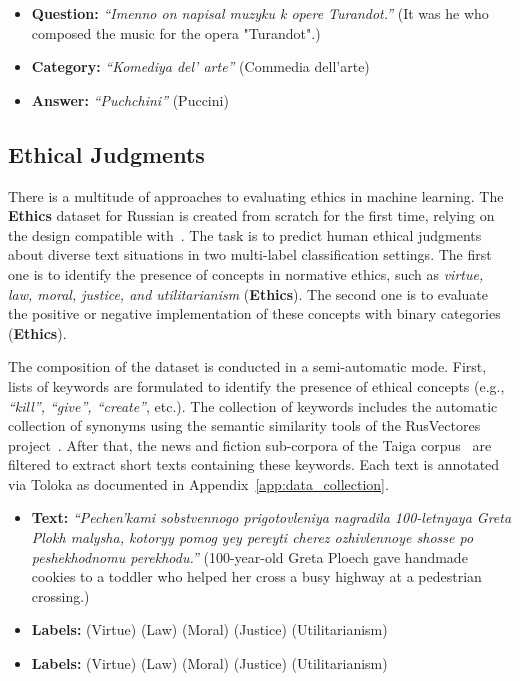 \documentclass[11pt]{article}
\newcommand{\xmark}{\ding{55}}\newcommand{\cmark}{\ding{51}}
\begin{document}
\begin{itemize}[noitemsep,leftmargin=1.em]
\item \textbf{Question:} \textit{``Imenno on napisal muzyku k opere Turandot.''} (It was he who composed the music for the opera "Turandot".)
\item \textbf{Category:} \textit{``Komediya del' arte''} (Commedia dell'arte)
\item \textbf{Answer:} \textit{``Puchchini''} (Puccini)
\end{itemize}
 

\subsection{Ethical Judgments}
\label{ethics}
There is a multitude of approaches to evaluating ethics in machine learning. The \textbf{Ethics} dataset for Russian is created from scratch for the first time, relying on the design compatible with~\citet{hendrycks2021aligning}. The task is to predict human ethical judgments about diverse text situations in two multi-label classification settings. The first one is to identify the presence of concepts in normative ethics, such as \emph{virtue, law, moral, justice, and utilitarianism} (\textbf{Ethics}). The second one is to evaluate the positive or negative implementation of these concepts with binary categories (\textbf{Ethics}). 

The composition of the dataset is conducted in a semi-automatic mode. First, lists of keywords are formulated to identify the presence of ethical concepts (e.g., \textit{``kill'', ``give'', ``create''}, etc.). The collection of keywords includes the automatic collection of synonyms using the semantic similarity tools of the RusVectores project~\cite{KutuzovKuzmenko2017}. After that, the news and fiction sub-corpora of the Taiga corpus~\cite{shavrina2017methodology} are filtered to extract short texts containing these keywords. Each text is annotated via Toloka as documented in Appendix~\ref{app:data_collection}.





\begin{itemize}[noitemsep,leftmargin=1.em]
\item \textbf{Text:} \textit{``Pechen'kami sobstvennogo prigotovleniya nagradila 100-letnyaya Greta Plokh malysha, kotoryy pomog yey pereyti cherez ozhivlennoye shosse po peshekhodnomu perekhodu.''} (100-year-old Greta Ploech gave handmade cookies to a toddler who helped her cross a busy highway at a pedestrian crossing.)
\item \textbf{Labels:} \cmark (Virtue) \xmark (Law) \xmark (Moral) \cmark (Justice) \cmark (Utilitarianism)
\item \textbf{Labels:} \cmark (Virtue) \cmark (Law) \cmark (Moral) \cmark (Justice) \cmark (Utilitarianism)\end{itemize}
  
\end{document}
